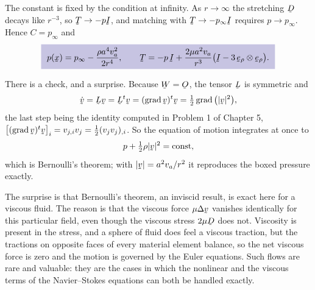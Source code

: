 \begin{solution}
The constant is fixed by the condition at infinity. As $r\to\infty$ the
stretching $\bD$ decays like $r^{-3}$, so $\bT\to-p\I$, and matching
with $\bT\to-p_{\infty}\I$ requires $p\to p_{\infty}$. Hence
$C=p_{\infty}$ and
\[
   \boxed{\ p(\bx)=p_{\infty}-\frac{\rho a^{4}v_{a}^{2}}{2r^{4}},
   \qquad
   \bT=-p\,\I+\frac{2\mu a^{2}v_{a}}{r^{3}}
   \big(\I-3\,\berho\otimes\berho\big). \ }
\]

There is a check, and a surprise. Because $\bW=\Ob$, the tensor $\bL$ is
symmetric and
\[
   \dot\bv=\bL\bv=\bL^{t}\bv=(\grad\bv)^{t}\bv
   =\tfrac12\grad\big(|\bv|^{2}\big),
\]
the last step being the identity computed in Problem 1 of Chapter 5,
$\big[(\grad\bv)^{t}\bv\big]_{i}=v_{j,i}v_{j}
=\tfrac12(v_{j}v_{j})_{,i}$. So the equation of motion integrates at
once to
\[
   p+\tfrac12\rho|\bv|^{2}=\text{const},
\]
which is Bernoulli's theorem; with $|\bv|=a^{2}v_{a}/r^{2}$ it
reproduces the boxed pressure exactly.

The surprise is that Bernoulli's theorem, an inviscid result, is exact
here for a viscous fluid. The reason is that the viscous force
$\mu\Delta\bv$ vanishes identically for this particular field, even
though the viscous stress $2\mu\bD$ does not. Viscosity is present in
the stress, and a sphere of fluid does feel a viscous traction, but the
tractions on opposite faces of every material element balance, so the
net viscous force is zero and the motion is governed by the Euler
equations. Such flows are rare and valuable: they are the cases in which
the nonlinear and the viscous terms of the Navier--Stokes equations can
both be handled exactly.
\end{solution}
